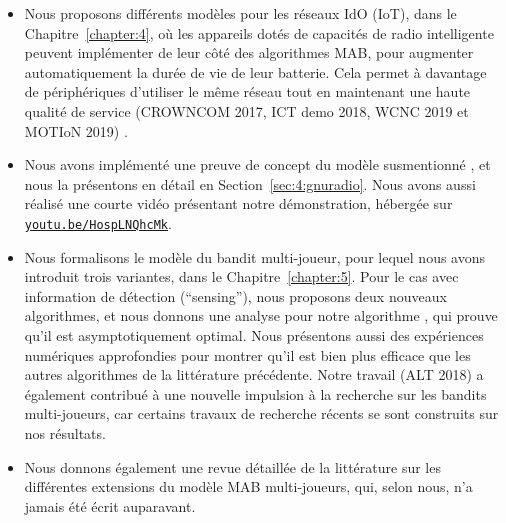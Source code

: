 \begin{resume_fr}
\begin{itemize}
    \item
    Nous proposons différents modèles pour les réseaux IdO (IoT), dans le Chapitre~\ref{chapter:4}, où les appareils dotés de capacités de radio intelligente peuvent implémenter de leur côté des algorithmes MAB, pour augmenter automatiquement la durée de vie de leur batterie. Cela permet à davantage de périphériques d'utiliser le même réseau tout en maintenant une haute qualité de service
    (CROWNCOM 2017, ICT demo 2018, WCNC 2019 et MOTIoN 2019)
    \cite{Bonnefoi17,Besson2019WCNC,Bonnefoi2019WCNC}.

    \item
    Nous avons implémenté une preuve de concept du modèle susmentionné \cite{Besson2018ICT}, et nous la présentons en détail en Section~\ref{sec:4:gnuradio}. Nous avons aussi réalisé une courte vidéo présentant notre démonstration, hébergée sur \texttt{\href{https://youtu.be/HospLNQhcMk}{youtu.be/HospLNQhcMk}}.


    \item
    Nous formalisons le modèle du bandit multi-joueur, pour lequel nous avons introduit trois variantes, dans le Chapitre~\ref{chapter:5}.
    Pour le cas avec information de détection (``sensing''), nous proposons deux nouveaux algorithmes, et nous donnons une analyse pour notre algorithme \MCTopM, qui prouve qu'il est asymptotiquement optimal.
    Nous présentons aussi des expériences numériques approfondies pour montrer qu'il est bien plus efficace que les autres algorithmes de la littérature précédente.
    Notre travail \cite{Besson2018ALT} (ALT 2018) a également contribué à une nouvelle impulsion à la recherche sur les bandits multi-joueurs, car certains travaux de recherche récents se sont construits sur nos résultats.

    \item
    Nous donnons également une revue détaillée de la littérature sur les différentes extensions du modèle MAB multi-joueurs, qui, selon nous, n'a jamais été écrit auparavant.


\end{itemize}
\end{resume_fr}
